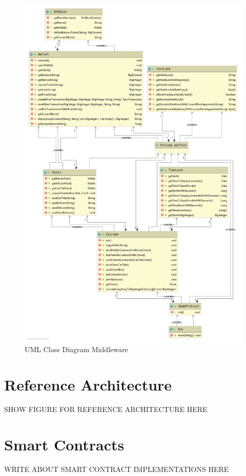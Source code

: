 \begin{figure}[h]
	\includegraphics[width=0.6\paperwidth]{swaps-crop}	%
	\caption{UML Class Diagram Middleware}
	\label{fig:uml}
\end{figure}

\clearpage


\section{Reference Architecture}
\label{sec:chapter04:ref_architecture}

SHOW FIGURE FOR REFERENCE ARCHITECTURE HERE
%
%
\section{Smart Contracts}
\label{sec:chapter04:smartcontracts}
WRITE ABOUT SMART CONTRACT IMPLEMENTATIONS HERE

